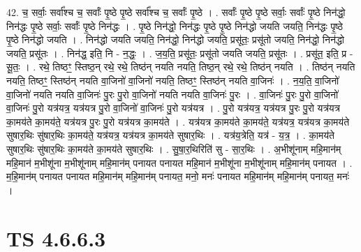\documentclass[17pt]{extarticle}
\begin{document}
42. च॒ सर्वाः॒ सर्वा᳚श्च च॒ सर्वाः᳚ पृ॒ष्ठे पृ॒ष्ठे सर्वा᳚श्च च॒ सर्वाः᳚ पृ॒ष्ठे । . सर्वाः᳚ पृ॒ष्ठे पृ॒ष्ठे सर्वाः॒ सर्वाः᳚ पृ॒ष्ठे निन॑द्धो॒ निन॑द्धः पृ॒ष्ठे सर्वाः॒ सर्वाः᳚ पृ॒ष्ठे निन॑द्धः । . पृ॒ष्ठे निन॑द्धो॒ निन॑द्धः पृ॒ष्ठे पृ॒ष्ठे निन॑द्धो जयति जयति॒ निन॑द्धः पृ॒ष्ठे पृ॒ष्ठे निन॑द्धो जयति । . निन॑द्धो जयति जयति॒ निन॑द्धो॒ निन॑द्धो जयति॒ प्रसू॑तः॒ प्रसू॑तो जयति॒ निन॑द्धो॒ निन॑द्धो जयति॒ प्रसू॑तः । . निन॑द्ध॒ इति॒ नि - न॒द्धः॒ । . ज॒य॒ति॒ प्रसू॑तः॒ प्रसू॑तो जयति जयति॒ प्रसू॑तः । . प्रसू॑त॒ इति॒ प्र - सू॒तः॒ । . रथे॒ तिष्ठꣳ॒॒ स्तिष्ठ॒न् रथे॒ रथे॒ तिष्ठ॑न् नयति नयति॒ तिष्ठ॒न् रथे॒ रथे॒ तिष्ठ॑न् नयति । . तिष्ठ॑न् नयति नयति॒ तिष्ठꣳ॒॒ स्तिष्ठ॑न् नयति वा॒जिनो॑ वा॒जिनो॑ नयति॒ तिष्ठꣳ॒॒ स्तिष्ठ॑न् नयति वा॒जिनः॑ । . न॒य॒ति॒ वा॒जिनो॑ वा॒जिनो॑ नयति नयति वा॒जिनः॑ पु॒रः पु॒रो वा॒जिनो॑ नयति नयति वा॒जिनः॑ पु॒रः । . वा॒जिनः॑ पु॒रः पु॒रो वा॒जिनो॑ वा॒जिनः॑ पु॒रो यत्र॑यत्र॒ यत्र॑यत्र पु॒रो वा॒जिनो॑ वा॒जिनः॑ पु॒रो यत्र॑यत्र । . पु॒रो यत्र॑यत्र॒ यत्र॑यत्र पु॒रः पु॒रो यत्र॑यत्र का॒मय॑ते का॒मय॑ते॒ यत्र॑यत्र पु॒रः पु॒रो यत्र॑यत्र का॒मय॑ते । . यत्र॑यत्र का॒मय॑ते का॒मय॑ते॒ यत्र॑यत्र॒ यत्र॑यत्र का॒मय॑ते सुषार॒थिः सु॑षार॒थिः का॒मय॑ते॒ यत्र॑यत्र॒ यत्र॑यत्र का॒मय॑ते सुषार॒थिः । . यत्र॑य॒त्रेति॒ यत्र॑ - य॒त्र॒ । . का॒मय॑ते सुषार॒थिः सु॑षार॒थिः का॒मय॑ते का॒मय॑ते सुषार॒थिः । . सु॒षा॒र॒थिरिति॑ सु - सा॒र॒थिः । . अ॒भीशू॑नाम् महि॒मान॑म् महि॒मान॑ म॒भीशू॑ना म॒भीशू॑नाम् महि॒मान॑म् पनायत पनायत महि॒मान॑ म॒भीशू॑ना म॒भीशू॑नाम् महि॒मान॑म् पनायत । . म॒हि॒मान॑म् पनायत पनायत महि॒मान॑म् महि॒मान॑म् पनायत॒ मनो॒ मनः॑ पनायत महि॒मान॑म् महि॒मान॑म् पनायत॒ मनः॑ । \newline
\pagebreak
{}

\section{ TS 4.6.6.3 }
\end{document}
